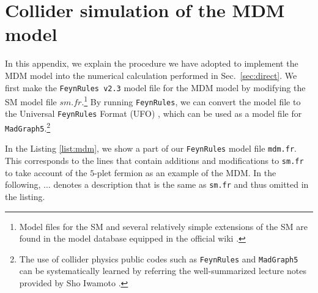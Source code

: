 \documentclass[12pt,twoside,book]{article}
\begin{document}
\section{Collider simulation of the MDM model}
\label{sec:feynrules}

\vskip 0.1in

In this appendix, we explain the procedure we have adopted to implement the MDM model into the numerical calculation performed in Sec.~\ref{sec:direct}.
We first make the \texttt{FeynRules v2.3} \cite{Alloul:2013bka} model file for the MDM model by modifying the SM model file $sm.fr$.\footnote{
  Model files for the SM and several relatively simple extensions of the SM are found in the model database equipped in the official wiki \cite{Alloul:wiki}.
}
By running \texttt{FeynRules}, we can convert the model file to the Universal \texttt{FeynRules} Format (UFO) \cite{Degrande:2011ua}, which can be used as a model file for \texttt{MadGraph5}.\footnote{
  The use of collider physics public codes such as \texttt{FeynRules} and \texttt{MadGraph5} can be systematically learned by referring the well-summarized lecture notes provided by Sho Iwamoto \cite{Iwamoto:FeynLecture}.
}

In the Listing \ref{list:mdm}, we show a part of our \texttt{FeynRules} model file \texttt{mdm.fr}.
This corresponds to the lines that contain additions and modifications to \texttt{sm.fr} to take account of the $5$-plet fermion as an example of the MDM.
In the following, $\dots$ denotes a description that is the same as \texttt{sm.fr} and thus omitted in the listing.
\end{document}
